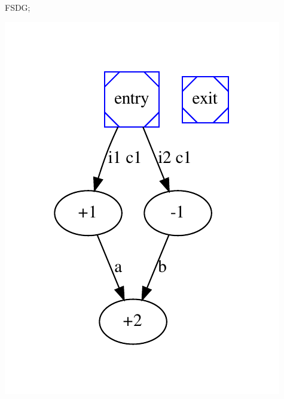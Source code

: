 \begin{DoxyItemize}
\item F\+S\+DG; 
\begin{DoxyImageNoCaption}
  \mbox{\includegraphics[width=\textwidth,height=\textheight/2,keepaspectratio=true]{dot_inline_dotgraph_22}}
\end{DoxyImageNoCaption}


\end{DoxyItemize}
